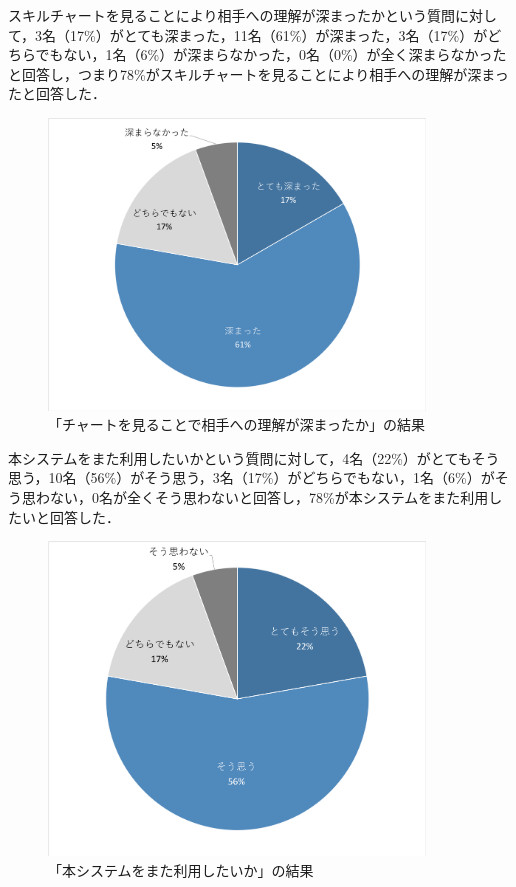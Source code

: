\documentclass{funthesis}
\begin{document}
スキルチャートを見ることにより相手への理解が深まったかという質問に対して，3名（17\%）がとても深まった，11名（61\%）が深まった，3名（17\%）がどちらでもない，1名（6\%）が深まらなかった，0名（0\%）が全く深まらなかったと回答し，つまり78\%がスキルチャートを見ることにより相手への理解が深まったと回答した．
\begin{figure}[H]
 \centering
   \includegraphics[width=100mm]{figures/finalExChart2.png}
 \caption{「チャートを見ることで相手への理解が深まったか」の結果}
 \label{testtest}
\end{figure}

本システムをまた利用したいかという質問に対して，4名（22\%）がとてもそう思う，10名（56\%）がそう思う，3名（17\%）がどちらでもない，1名（6\%）がそう思わない，0名が全くそう思わないと回答し，78\%が本システムをまた利用したいと回答した．
\begin{figure}[H]
 \centering
   \includegraphics[width=100mm]{figures/finalExChart.png}
 \caption{「本システムをまた利用したいか」の結果}
 \label{testtest}
\end{figure}
\end{document}
